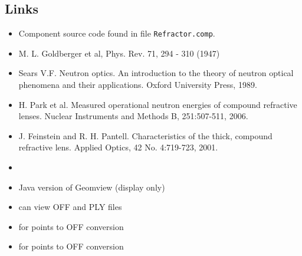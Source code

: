 \subsection*{Links}
\begin{itemize}
  \item Component source code found in file \texttt{Refractor.comp}.
  \item M. L. Goldberger et al, Phys. Rev. 71, 294 - 310 (1947)
  \item Sears V.F. Neutron optics. An introduction to the theory of neutron optical phenomena and their applications. Oxford University Press, 1989.
  \item H. Park et al. Measured operational neutron energies of compound refractive lenses. Nuclear Instruments and Methods B, 251:507-511, 2006.
  \item J. Feinstein and R. H. Pantell. Characteristics of the thick, compound refractive lens. Applied Optics, 42 No. 4:719-723, 2001.
  \item {}
  \item Java version of Geomview (display only) 
  \item {} can view OFF and PLY files
  \item {} for points to OFF conversion
  \item {} for points to OFF conversion
\end{itemize}
